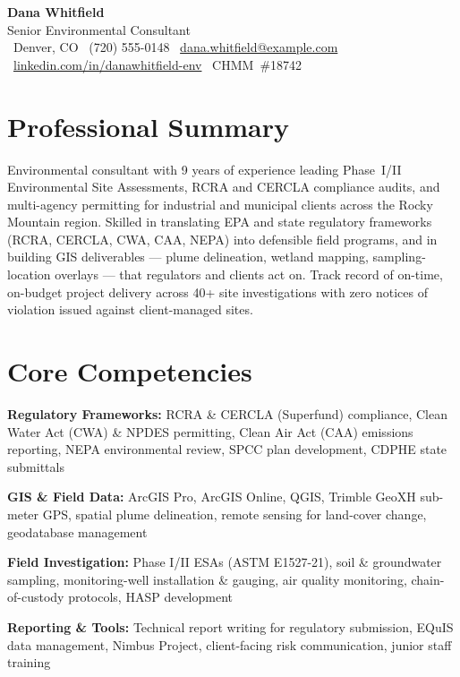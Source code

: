 \documentclass[10pt,letterpaper]{article}
\newcommand{\skillrow}[2]{%
  \textbf{\color{forest}#1:} {\color{slate}#2}\par\vspace{1pt}
}
\begin{document}
\begin{center}
  {\fontsize{22}{24}\selectfont\bfseries\color{forest} Dana Whitfield}\\[1pt]
  {\large\color{slate} Senior Environmental Consultant}\\[4pt]
  {\small\color{stone}
    \faMapMarker\ Denver, CO \quad\textbar\quad
    \faPhone\ (720) 555-0148 \quad\textbar\quad
    \faEnvelope\ \href{mailto:dana.whitfield@example.com}{dana.whitfield@example.com} \quad\textbar\quad
    \faLinkedin\ \href{https://linkedin.com/in/danawhitfield-env}{linkedin.com/in/danawhitfield-env} \quad\textbar\quad
    \mbox{\faIdBadge\ CHMM \#18742}
  }
\end{center}
\vspace{-6pt}
\noindent{\color{hairline}\rule{\linewidth}{1.1pt}}
\vspace{1pt}

\section{Professional Summary}
Environmental consultant with 9 years of experience leading Phase~I/II Environmental Site
Assessments, RCRA and CERCLA compliance audits, and multi-agency permitting for industrial and
municipal clients across the Rocky Mountain region. Skilled in translating EPA and state
regulatory frameworks (RCRA, CERCLA, CWA, CAA, NEPA) into defensible field programs, and in
building GIS deliverables --- plume delineation, wetland mapping, sampling-location overlays ---
that regulators and clients act on. Track record of on-time, on-budget project delivery across
40+ site investigations with zero notices of violation issued against client-managed sites.

\section{Core Competencies}
\small
\skillrow{Regulatory Frameworks}{RCRA \& CERCLA (Superfund) compliance, Clean Water Act (CWA) \& NPDES permitting, Clean Air Act (CAA) emissions reporting, NEPA environmental review, SPCC plan development, CDPHE state submittals}
\skillrow{GIS \& Field Data}{ArcGIS Pro, ArcGIS Online, QGIS, Trimble GeoXH sub-meter GPS, spatial plume delineation, remote sensing for land-cover change, geodatabase management}
\skillrow{Field Investigation}{Phase I/II ESAs (ASTM E1527-21), soil \& groundwater sampling, monitoring-well installation \& gauging, air quality monitoring, chain-of-custody protocols, HASP development}
\skillrow{Reporting \& Tools}{Technical report writing for regulatory submission, EQuIS data management, Nimbus Project, client-facing risk communication, junior staff training}
\normalsize
\end{document}
